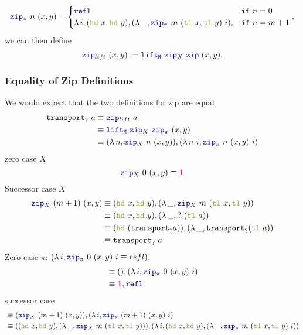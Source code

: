 \documentclass[twoside,11pt,openright]{report}
\theoremstyle{plain} %
\theoremstyle{definition}
\theoremstyle{remark}
\newcommand*{\type}[1]{\textcolor{magenta!90!black}{#1}}
\newcommand*{\unit}{\type{\textbf{1}}}
\newcommand*{\function}[1]{\textcolor{blue!60!black}{\ensuremath{\mathtt{#1}}}}
\newcommand*{\destructor}[1]{\textcolor{yellow!60!black}{\ensuremath{\mathtt{#1}}}}
\begin{document}
\begin{equation}
  \function{zip}_{\pi}~n~(x , y) = \begin{cases} \function{refl} & \mathtt{if}~n = 0 \\ \lambda\,i,(\destructor{hd}~x , \destructor{hd}~y) , (\lambda\,\_, \function{zip}_{\pi}~m~(\destructor{tl}~x,\destructor{tl}~y)~i) , & \mathtt{if}~n = m + 1 \end{cases},
\end{equation}
we can then define
\begin{equation}
  \function{zip}_{lift}~(x , y) := \function{lift_M}~\function{zip}_X~\function{zip}~(x,y).
\end{equation}
\subsubsection{Equality of Zip Definitions}
We would expect that the two definitions for zip are equal
\begin{align}
  \texttt{transport}_{?}~a &\equiv \function{zip}_{lift}~a \\
                           &\equiv \function{lift_M}~\function{zip}_X~\function{zip}_\pi~(x,y) \\
                           &\equiv (\lambda\,n, \function{zip}_X~n~(x,y)) , (\lambda\,n~i, \function{zip}_\pi~n~(x,y)~i)
\end{align}
zero case \(X\)
\begin{equation}
  \function{zip}_X~0~(x,y) \equiv \unit
\end{equation}
Successor case \(X\)
\begin{align} 
  \function{zip}_X~(m+1)~(x,y) &\equiv (\destructor{hd}~x, \destructor{hd}~y),(\lambda\,\_,\function{zip}_X~m~(\destructor{tl}~x,\destructor{tl}~y)) \\
                               &\equiv (\destructor{hd}~x, \destructor{hd}~y),(\lambda\,\_, {?}~(\destructor{tl}~a)) \\
                               &\equiv (\destructor{hd}~(\texttt{transport}_{?} a)),(\lambda\,\_, \texttt{transport}_{?} (\destructor{tl}~a)) \\
                               &\equiv \mathtt{transport}_?~a \\
\end{align}
Zero case \(\pi\): \((\lambda\,i, \function{zip}_\pi~0~(x,y)~i \equiv refl)\).
\begin{align}
  &\equiv () , (\lambda\,i, \function{zip}_\pi~0~(x,y)~i) \\
  &\equiv \unit , \function{refl} \\
\end{align}
successor case
\begin{align}
  &\equiv (\function{zip}_X~(m+1)~(x,y)) , (\lambda\,i, \function{zip}_\pi~(m+1)~(x,y)~i) \\
  &\equiv ((\destructor{hd}~x, \destructor{hd}~y),(\lambda\,\_,\function{zip}_X~m~(\destructor{tl}~x,\destructor{tl}~y))) , (\lambda\,i, (\destructor{hd}~x, \destructor{hd}~y),(\lambda\,\_,\function{zip}_\pi~m~(\destructor{tl}~x,\destructor{tl}~y)~i))
\end{align}
\end{document}
